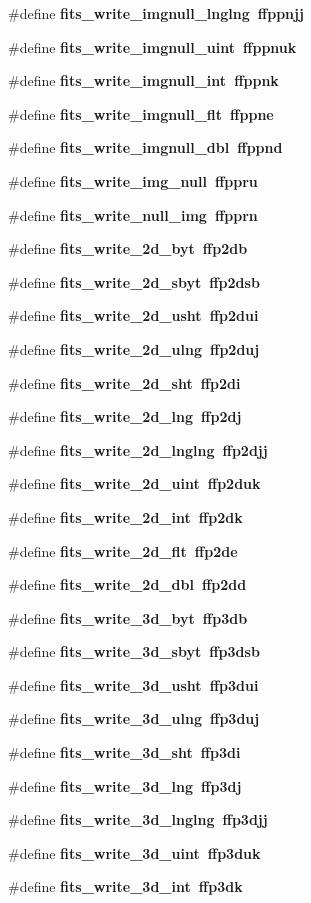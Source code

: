 \begin{CompactItemize}
\item 
\#define \bf{fits\_\-write\_\-imgnull\_\-lnglng}~ffppnjj
\item 
\#define \bf{fits\_\-write\_\-imgnull\_\-uint}~ffppnuk
\item 
\#define \bf{fits\_\-write\_\-imgnull\_\-int}~ffppnk
\item 
\#define \bf{fits\_\-write\_\-imgnull\_\-flt}~ffppne
\item 
\#define \bf{fits\_\-write\_\-imgnull\_\-dbl}~ffppnd
\item 
\#define \bf{fits\_\-write\_\-img\_\-null}~ffppru
\item 
\#define \bf{fits\_\-write\_\-null\_\-img}~ffpprn
\item 
\#define \bf{fits\_\-write\_\-2d\_\-byt}~ffp2db
\item 
\#define \bf{fits\_\-write\_\-2d\_\-sbyt}~ffp2dsb
\item 
\#define \bf{fits\_\-write\_\-2d\_\-usht}~ffp2dui
\item 
\#define \bf{fits\_\-write\_\-2d\_\-ulng}~ffp2duj
\item 
\#define \bf{fits\_\-write\_\-2d\_\-sht}~ffp2di
\item 
\#define \bf{fits\_\-write\_\-2d\_\-lng}~ffp2dj
\item 
\#define \bf{fits\_\-write\_\-2d\_\-lnglng}~ffp2djj
\item 
\#define \bf{fits\_\-write\_\-2d\_\-uint}~ffp2duk
\item 
\#define \bf{fits\_\-write\_\-2d\_\-int}~ffp2dk
\item 
\#define \bf{fits\_\-write\_\-2d\_\-flt}~ffp2de
\item 
\#define \bf{fits\_\-write\_\-2d\_\-dbl}~ffp2dd
\item 
\#define \bf{fits\_\-write\_\-3d\_\-byt}~ffp3db
\item 
\#define \bf{fits\_\-write\_\-3d\_\-sbyt}~ffp3dsb
\item 
\#define \bf{fits\_\-write\_\-3d\_\-usht}~ffp3dui
\item 
\#define \bf{fits\_\-write\_\-3d\_\-ulng}~ffp3duj
\item 
\#define \bf{fits\_\-write\_\-3d\_\-sht}~ffp3di
\item 
\#define \bf{fits\_\-write\_\-3d\_\-lng}~ffp3dj
\item 
\#define \bf{fits\_\-write\_\-3d\_\-lnglng}~ffp3djj
\item 
\#define \bf{fits\_\-write\_\-3d\_\-uint}~ffp3duk
\item 
\#define \bf{fits\_\-write\_\-3d\_\-int}~ffp3dk

\end{CompactItemize}

